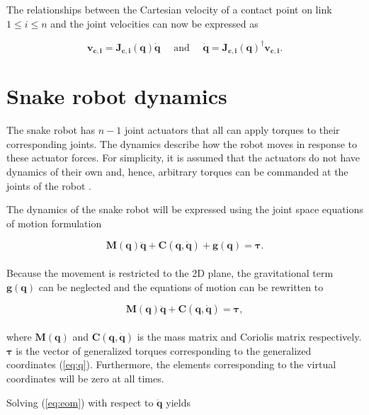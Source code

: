 The relationships between the Cartesian velocity of a contact point on link $1\leq i\leq n$ and the joint velocities can now be expressed as

\begin{equation}
    \mathbf{v_{c,i} = J_{c,i}(q) \dot{q}} \quad \textrm{ and } \quad \mathbf{\dot{q} = J_{c,i}(q)^\dagger v_{c,i}}.
\end{equation}



\section{Snake robot dynamics} \label{sec:dyn}

The snake robot has $n-1$ joint actuators that all can apply torques to their corresponding joints. The dynamics describe how the robot moves in response to these actuator forces. For simplicity, it is assumed that the actuators do not have dynamics of their own and, hence, arbitrary torques can be commanded at the joints of the robot \cite{murray2017mathematical}.

The dynamics of the snake robot will be expressed using the joint space equations of motion formulation

\begin{equation}
    \mathbf{M(q)\ddot{q} + C(q, \dot{q}) + g(q)} = \boldsymbol{\tau}.
\end{equation}
\\
Because the movement is restricted to the 2D plane, the gravitational term $\mathbf{g(q)}$ can be neglected and the equations of motion can be rewritten to

\begin{equation}\label{eq:eom}
    \mathbf{M(q)\ddot{q} + C(q, \dot{q})} = \boldsymbol{\tau},
\end{equation}
\\
where $\mathbf{M(q)}$ and $\mathbf{C(q,\dot{q})}$ is the mass matrix and Coriolis matrix respectively.
$\boldsymbol{\tau}$ is the vector of generalized torques corresponding to the generalized coordinates (\ref{eq:q}). Furthermore, the elements corresponding to the virtual coordinates will be zero at all times.

Solving (\ref{eq:eom}) with respect to $\mathbf{\ddot{q}}$ yields

